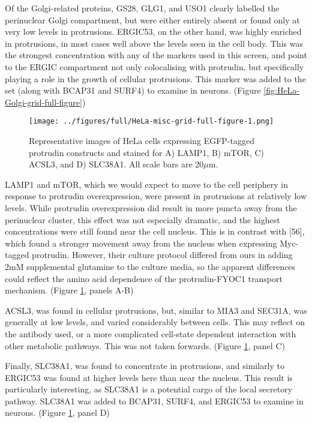\documentclass[
  12pt,
  a4paper,
]{book}
\begin{document}
Of the Golgi-related proteins, GS28, GLG1, and USO1 clearly labelled the perinuclear Golgi compartment, but were either entirely absent or found only at very low levels in protrusions. ERGIC53, on the other hand, was highly enriched in protrusions, in most cases well above the levels seen in the cell body. This was the strongest concentration with any of the markers used in this screen, and point to the ERGIC compartment not only colocalising with protrudin, but specifically playing a role in the growth of cellular protrusions. This marker was added to the set (along with BCAP31 and SURF4) to examine in neurons. (Figure \ref{fig:HeLa-Golgi-grid-full-figure})

\begin{figure}
\centering
\texttt{[image: ../figures/full/HeLa-misc-grid-full-figure-1.png]}
\caption{\label{fig:HeLa-misc-grid-full-figure}Representative images of HeLa cells expressing EGFP-tagged protrudin constructs and stained for A) LAMP1, B) mTOR, C) ACSL3, and D) SLC38A1. All scale bars are 20\(\mu\)m.}
\end{figure}

LAMP1 and mTOR, which we would expect to move to the cell periphery in response to protrudin overexpression, were present in protrusions at relatively low levels. While protrudin overexpression did result in more puncta away from the perinuclear cluster, this effect was not especially dramatic, and the highest concentrations were still found near the cell nucleus. This is in contrast with {[}56{]}, which found a stronger movement away from the nucleus when expressing Myc-tagged protrudin. However, their culture protocol differed from ours in adding 2mM supplemental glutamine to the culture media, so the apparent differences could reflect the amino acid dependence of the protrudin-FYOC1 transport mechanism. (Figure \ref{fig:HeLa-misc-grid-full-figure}, panels A-B)

ACSL3, was found in cellular protrusions, but, similar to MIA3 and SEC31A, was generally at low levels, and varied considerably between cells. This may reflect on the antibody used, or a more complicated cell-state dependent interaction with other metabolic pathways. This was not taken forwards. (Figure \ref{fig:HeLa-misc-grid-full-figure}, panel C)

Finally, SLC38A1, was found to concentrate in protrusions, and similarly to ERGIC53 was found at higher levels here than near the nucleus. This result is particularly interesting, as SLC38A1 is a potential cargo of the local secretory pathway. SLC38A1 was added to BCAP31, SURF4, and ERGIC53 to examine in neurons. (Figure \ref{fig:HeLa-misc-grid-full-figure}, panel D)
\end{document}
